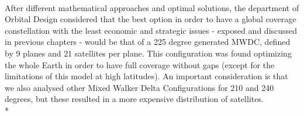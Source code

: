 \paragraph{ }


After different mathematical approaches and optimal solutions, the department of Orbital Design considered that the best option in order to have a global coverage constellation with the least economic and strategic issues - exposed and discussed in previous chapters - would be that of a 225 degree generated MWDC, defined by 9 planes and 21 satellites per plane. This configuration was found optimizing the whole Earth in order to have full coverage without gaps (except for the limitations of this model at high latitudes). An important consideration is that we also analysed other Mixed Walker Delta Configurations for 210 and 240 degrees, but these resulted in a more expensive distribution of satellites.  \\*
